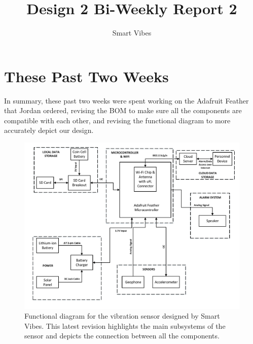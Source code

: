 \documentclass[12pt]{article}
\begin{document}
\title{Design 2 Bi-Weekly Report 2}
\author{Smart Vibes}
\maketitle

\newpage
\tableofcontents

\newpage
\section{These Past Two Weeks}
In summary, these past two weeks were spent working on the Adafruit Feather that Jordan ordered, revising the BOM to make sure all the components are compatible with each other, and revising the functional diagram to more accurately depict our design.

\begin{figure}[H]
    \centering
    \includegraphics[width=\textwidth]{src/functional_diagram.pdf}
    \caption{Functional diagram for the vibration sensor designed by Smart Vibes. This latest revision highlights the main subsystems of the sensor and depicts the connection between all the components.}
    \label{fig:gantt_chart}
\end{figure}
\end{document}

